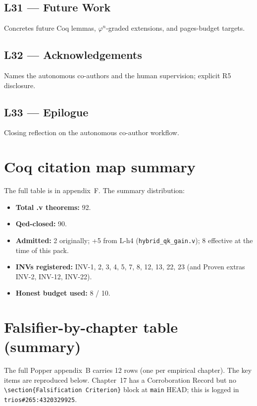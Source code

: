 \subsection*{L31 — Future Work} Concretes future Coq lemmas,
$\varphi^{n}$-graded extensions, and pages-budget targets.

\subsection*{L32 — Acknowledgements} Names the autonomous co-authors and
the human supervision; explicit R5 disclosure.

\subsection*{L33 — Epilogue} Closing reflection on the autonomous
co-author workflow.

\section{Coq citation map summary}

The full table is in appendix~F. The summary distribution:

\begin{itemize}
  \item \textbf{Total .v theorems:} 92.
  \item \textbf{Qed-closed:} 90.
  \item \textbf{Admitted:} 2 originally; +5 from L-h4 (\texttt{hybrid\_qk\_gain.v}); 8 effective at the time of this pack.
  \item \textbf{INVs registered:} INV-1, 2, 3, 4, 5, 7, 8, 12, 13, 22, 23 (and Proven extras INV-2, INV-12, INV-22).
  \item \textbf{Honest budget used:} 8 / 10.
\end{itemize}

\section{Falsifier-by-chapter table (summary)}

The full Popper appendix~B carries 12 rows (one per empirical chapter). The
key items are reproduced below. Chapter~17 has a Corroboration Record but
no \texttt{\textbackslash section\{Falsification Criterion\}} block at
\texttt{main} HEAD; this is logged in
\texttt{trios\#265:4320329925}.


